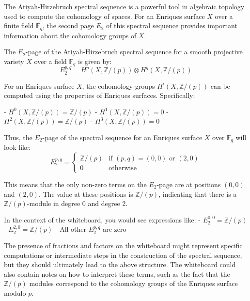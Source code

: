 The Atiyah-Hirzebruch spectral sequence is a powerful tool in algebraic topology used to compute the cohomology of spaces. For an Enriques surface \(X\) over a finite field \(\mathbb{F}_q\), the second page \(E_2\) of this spectral sequence provides important information about the cohomology groups of \(X\).

The \(E_2\)-page of the Atiyah-Hirzebruch spectral sequence for a smooth projective variety \(X\) over a field \(\mathbb{F}_q\) is given by:
\[ E_2^{p,q} = H^p(X, \mathbb{Z}/(p)) \otimes H^q(X, \mathbb{Z}/(p)) \]

For an Enriques surface \(X\), the cohomology groups \(H^i(X, \mathbb{Z}/(p))\) can be computed using the properties of Enriques surfaces. Specifically:

- \(H^0(X, \mathbb{Z}/(p)) = \mathbb{Z}/(p)\)
- \(H^1(X, \mathbb{Z}/(p)) = 0\)
- \(H^2(X, \mathbb{Z}/(p)) = \mathbb{Z}/(p)\)
- \(H^3(X, \mathbb{Z}/(p)) = 0\)

Thus, the \(E_2\)-page of the spectral sequence for an Enriques surface \(X\) over \(\mathbb{F}_q\) will look like:
\[ E_2^{p,q} = 
\begin{cases}
\mathbb{Z}/(p) & \text{if } (p,q) = (0,0) \text{ or } (2,0) \\
0 & \text{otherwise}
\end{cases}
\]

This means that the only non-zero terms on the \(E_2\)-page are at positions \((0,0)\) and \((2,0)\). The value at these positions is \(\mathbb{Z}/(p)\), indicating that there is a \(\mathbb{Z}/(p)\)-module in degree 0 and degree 2.

In the context of the whiteboard, you would see expressions like:
- \(E_2^{0,0} = \mathbb{Z}/(p)\)
- \(E_2^{2,0} = \mathbb{Z}/(p)\)
- All other \(E_2^{p,q}\) are zero

The presence of fractions and factors on the whiteboard might represent specific computations or intermediate steps in the construction of the spectral sequence, but they should ultimately lead to the above structure. The whiteboard could also contain notes on how to interpret these terms, such as the fact that the \(\mathbb{Z}/(p)\) modules correspond to the cohomology groups of the Enriques surface modulo \(p\).